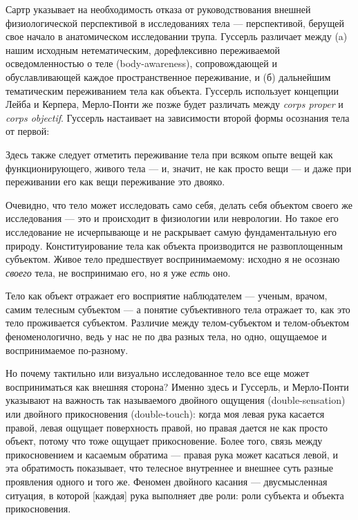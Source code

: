 \documentclass[11pt]{book}
\begin{document}
Сартр указывает на необходимость отказа от руководствования внешней физиологической перспективой в исследованиях тела --- перспективой, берущей свое начало в анатомическом исследовании трупа. Гуссерль различает между (a) нашим исходным нетематическим, дорефлексивно переживаемой осведомленностью о теле (body-awareness), сопровождающей и обуславливающей каждое пространственное переживание, и (б) дальнейшим тематическим переживанием тела как объекта. Гуссерль использует концепции Лейба и Керпера, Мерло-Понти же позже будет различать между \textit{corps proper} и \textit{corps objectif}. Гуссерль настаивает на зависимости второй формы осознания тела от первой:

\smallskip
{}\relax
{}\relax

Здесь также следует отметить переживание тела при всяком опыте вещей как функционирующего, живого тела --- и, значит, не как просто вещи --- и даже при переживании его как вещи переживание это двояко.

\relax
{}\relax
\smallskip

Очевидно, что тело может исследовать само себя, делать себя объектом своего же исследования --- это и происходит в физиологии или неврологии. Но такое его исследование не исчерпывающе и не раскрывает самую фундаментальную его природу. Конституирование тела как объекта производится не развоплощенным субъектом. Живое тело предшествует воспринимаемому: исходно я не осознаю \textit{своего} тела, не воспринимаю его, но я уже \textit{есть} оно.

Тело как объект отражает его восприятие наблюдателем --- ученым, врачом, самим телесным субъектом --- а понятие субъективного тела отражает то, как это тело проживается субъектом. Различие между телом-субъектом и телом-объектом феноменологично, ведь у нас не по два разных тела, но одно, ощущаемое и воспринимаемое по-разному.

Но почему тактильно или визуально исследованное тело все еще может восприниматься как внешняя сторона? Именно здесь и Гуссерль, и Мерло-Понти указывают на важность так называемого двойного ощущения (double-sensation) или двойного прикосновения (double-touch): когда моя левая рука касается правой, левая ощущает поверхность правой, но правая дается не как просто объект, потому что тоже ощущает прикосновение. Более того, связь между прикосновением и касаемым обратима --- правая рука может касаться левой, и эта обратимость показывает, что телесное внутреннее и внешнее суть разные проявления одного и того же. Феномен двойного касания --- двусмысленная ситуация, в которой [каждая] рука выполняет две роли: роли субъекта и объекта прикосновения.
\end{document}
